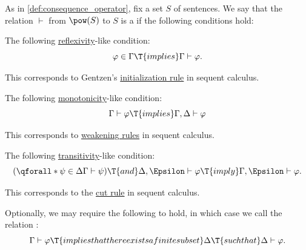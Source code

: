 \begin{definition}\label{def:consequence_relation}
  As in \cref{def:consequence_operator}, fix a set \( S \) of sentences. We say that the relation \( \vdash \) from \( \pow(S) \) to \( S \) is a  if the following conditions hold:
  \begin{thmenum}
     The following \hyperref[def:binary_relation/reflexive]{reflexivity}-like condition:
    \begin{equation}\label{eq:def:consequence_relation/reflexivity}
      \varphi \in \Gamma \T{implies} \Gamma \vdash \varphi.
    \end{equation}

    This corresponds to Gentzen's \hyperref[inf:def:abstract_sequent_calculus_system/ax]{initialization rule} in sequent calculus.

     The following \hyperref[def:order_function/preserving]{monotonicity}-like condition:
    \begin{equation}\label{eq:def:consequence_relation/monotonicity}
      \Gamma \vdash \varphi \T{implies} \Gamma, \Delta \vdash \varphi
    \end{equation}

    This corresponds to \hyperref[def:abstract_sequent_calculus_system/weak]{weakening rules} in sequent calculus.

     The following \hyperref[def:binary_relation/transitive]{transitivity}-like condition:
    \begin{equation}\label{eq:def:consequence_relation/transitivity}
      (\qforall* {\psi \in \Delta} \Gamma \vdash \psi) \T{and} \Delta, \Epsilon \vdash \varphi \T{imply} \Gamma, \Epsilon \vdash \varphi.
    \end{equation}

    This corresponds to the \hyperref[def:abstract_sequent_calculus_system/cut]{cut rule} in sequent calculus.

     Optionally, we may require the following to hold, in which case we call the relation :
    \begin{equation}\label{eq:def:consequence_relation/compactness}
      \Gamma \vdash \varphi \T{implies that there exists a finite subset} \Delta \T{such that} \Delta \vdash \varphi.
    \end{equation}
  \end{thmenum}
\end{definition}
